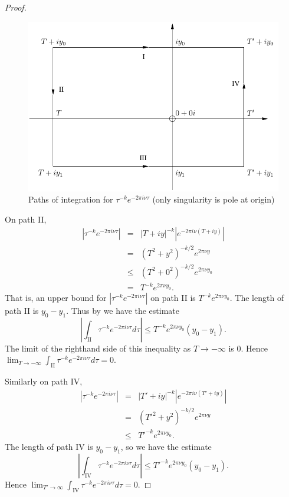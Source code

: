 \documentclass{article}
\begin{document}
\begin{proof}
\begin{figure}
\caption{Paths of integration for $\tau^{-k}e^{-2\pi i\nu \tau}$ (only singularity is pole at origin)}
\begin{center}
\includegraphics[scale=0.75]{fig1.pdf}
\end{center}
\label{figure1}
\end{figure}

On path II,
\begin{eqnarray*}
|\tau^{-k}e^{-2\pi i\nu \tau}|&=&|T+iy|^{-k}|e^{-2\pi i\nu(T+iy)}|\\
&=&(T^2+y^2)^{-k/2}e^{2\pi \nu y}\\
&\leq&(T^2+0^2)^{-k/2}e^{2\pi \nu y_0}\\
&=&T^{-k} e^{2\pi \nu y_0}.
\end{eqnarray*}
That is, an upper bound for $|\tau^{-k}e^{-2\pi i\nu \tau}|$ on path II is
$T^{-k} e^{2\pi \nu y_0}$.
The length of path II is $y_0-y_1$. Thus by \cite[Theorem 2.3, Chapter III]{MR1659317} we have
the estimate
\[
|\int_{\textrm{II}} \tau^{-k}e^{-2\pi i\nu \tau}d\tau| \leq T^{-k} e^{2\pi \nu y_0}(y_0-y_1).
\]
The limit of the righthand side of this inequality as $T \to -\infty$ is 0. Hence
$\lim_{T \to -\infty} \int_{\textrm{II}} \tau^{-k}e^{-2\pi i\nu \tau}d\tau=0$.

Similarly on path IV,
\begin{eqnarray*}
|\tau^{-k}e^{-2\pi i\nu \tau}|&=&|T'+iy|^{-k}|e^{-2\pi i\nu(T'+iy)}|\\
&=&(T'^2+y^2)^{-k/2}e^{2\pi \nu y}\\
&\leq&T'^{-k} e^{2\pi \nu y_0}.
\end{eqnarray*}
The length of path IV is $y_0-y_1$, so we have the estimate
\[
|\int_{\textrm{IV}} \tau^{-k}e^{-2\pi i\nu \tau}d\tau| \leq T'^{-k} e^{2\pi \nu y_0}(y_0-y_1).
\]
Hence
$\lim_{T' \to \infty} \int_{\textrm{IV}} \tau^{-k}e^{-2\pi i\nu \tau}d\tau=0$.


\end{proof}
\end{document}
